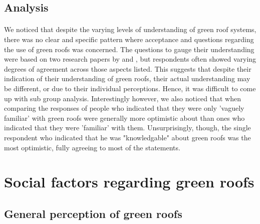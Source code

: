 \documentclass{article}
\begin{document}
\begin{multicols}{2}
  \subsection{Analysis}
  \paragraph{} We noticed that despite the varying levels of understanding
  of green roof systems, there was no clear and specific pattern
  where acceptance and questions regarding the use of green roofs was
  concerned. The questions to gauge their understanding were based on
  two research papers by  and ,
  but respondents often showed varying degrees of agreement across
  those aspects listed. This suggests that despite their indication of
  their understanding of green roofs, their actual understanding may
  be different, or due to their individual perceptions. Hence, it was
  difficult to come up with sub group analysis.  Interestingly however, we
  also noticed that when comparing the responses of people who indicated
  that they were only 'vaguely familiar' with green roofs were generally
  more optimistic about than ones who indicated that they were 'familiar'
  with them. Unsurprisingly, though, the single respondent who indicated
  that he was "knowledgable" about green roofs was the most optimistic,
  fully agreeing to most of the statements.



  \section{Social factors regarding green roofs}
  \subsection{General perception of green roofs}

\end{multicols}
\end{document}
